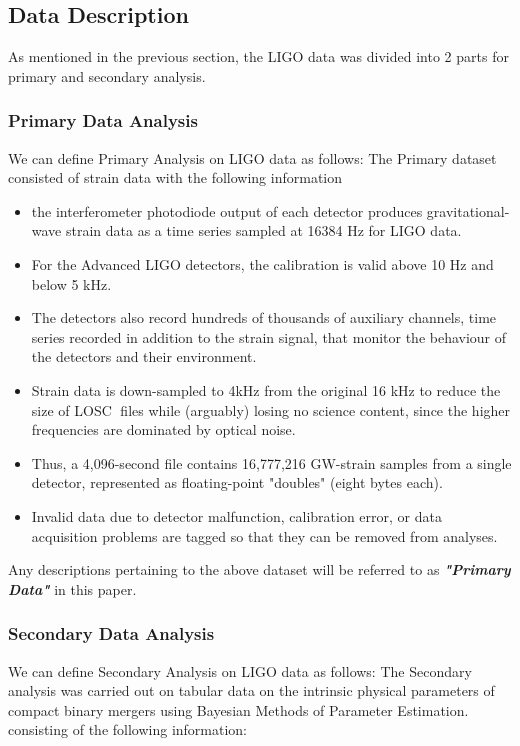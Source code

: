     \subsection{Data Description}
    As mentioned in the previous section, the LIGO data was divided into 2 parts for primary and secondary analysis.

    \subsubsection{Primary Data Analysis}

    We can define Primary Analysis on LIGO data as follows:
    The Primary dataset consisted of strain data with the following information

    \begin{itemize}
        \item the interferometer photodiode output of each detector produces gravitational-wave strain data as a time series sampled at 16384 Hz for LIGO data.
        \item For the Advanced LIGO detectors, the calibration is valid above 10 Hz and below 5 kHz.
        \item The detectors also record hundreds of thousands of auxiliary channels, time series recorded in addition to the strain signal, that monitor the behaviour of the detectors and their environment.
        \item Strain data is down-sampled to 4kHz from the original 16 kHz to reduce the size of LOSC files while (arguably) losing no science content, since the higher frequencies are dominated by
        optical noise.
        \item Thus, a 4,096-second file contains 16,777,216 GW-strain samples from a single
        detector, represented as floating-point "doubles" (eight bytes each).
        \item Invalid data due to detector malfunction, calibration error, or data acquisition problems are
    tagged so that they can be removed from analyses.

    \end{itemize}

    Any descriptions pertaining to the above dataset will be referred to as \textbf{\textit{"Primary Data"}} in this paper.

    \subsubsection{Secondary Data Analysis}
    We can define Secondary Analysis on LIGO data as follows:
    The Secondary analysis was carried out on tabular data  on the intrinsic physical parameters of compact binary mergers using Bayesian Methods of Parameter Estimation. \cite{00.7_LIGOBayesianAnalysis} \cite{00.6_LIGOAnalysisPipeline} \cite{24.4_CompactBinaryParameterEstimates} \cite{24.5_GWParameterEsitmation} \cite{24.6_LIGOParameterEstimates} consisting of the following information:

